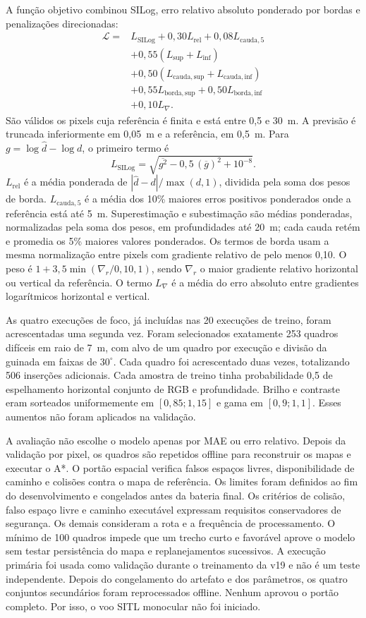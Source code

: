 A função objetivo combinou SILog, erro relativo absoluto ponderado por bordas e penalizações direcionadas:
\[
\begin{aligned}
\mathcal{L}={}&L_{\mathrm{SILog}}+0{,}30L_{\mathrm{rel}}
+0{,}08L_{\mathrm{cauda},5}\\
&+0{,}55(L_{\mathrm{sup}}+L_{\mathrm{inf}})\\
&+0{,}50(L_{\mathrm{cauda,sup}}+L_{\mathrm{cauda,inf}})\\
&+0{,}55L_{\mathrm{borda,sup}}+0{,}50L_{\mathrm{borda,inf}}\\
&+0{,}10L_{\nabla}.
\end{aligned}
\]
São válidos os pixels cuja referência é finita e está entre 0,5 e 30~m. A previsão é truncada inferiormente em 0,05~m e a referência, em 0,5~m. Para $g=\log \hat d-\log d$, o primeiro termo é
\[
L_{\mathrm{SILog}}=\sqrt{\overline{g^2}-0{,}5\,(\overline{g})^2+10^{-8}}.
\]
$L_{\mathrm{rel}}$ é a média ponderada de $|\hat d-d|/\max(d,1)$, dividida pela soma dos pesos de borda. $L_{\mathrm{cauda},5}$ é a média dos 10\% maiores erros positivos ponderados onde a referência está até 5~m. Superestimação e subestimação são médias ponderadas, normalizadas pela soma dos pesos, em profundidades até 20~m; cada cauda retém e promedia os 5\% maiores valores ponderados. Os termos de borda usam a mesma normalização entre pixels com gradiente relativo de pelo menos 0,10. O peso é $1+3{,}5\min(\nabla_r/0{,}10,1)$, sendo $\nabla_r$ o maior gradiente relativo horizontal ou vertical da referência. O termo $L_{\nabla}$ é a média do erro absoluto entre gradientes logarítmicos horizontal e vertical.

As quatro execuções de foco, já incluídas nas 20 execuções de treino, foram acrescentadas uma segunda vez. Foram selecionados exatamente 253 quadros difíceis em raio de 7~m, com alvo de um quadro por execução e divisão da guinada em faixas de $30^\circ$. Cada quadro foi acrescentado duas vezes, totalizando 506 inserções adicionais. Cada amostra de treino tinha probabilidade 0,5 de espelhamento horizontal conjunto de RGB e profundidade. Brilho e contraste eram sorteados uniformemente em $[0{,}85;1{,}15]$ e gama em $[0{,}9;1{,}1]$. Esses aumentos não foram aplicados na validação.

A avaliação não escolhe o modelo apenas por MAE ou erro relativo. Depois da validação por pixel, os quadros são repetidos offline para reconstruir os mapas e executar o A*. O portão espacial verifica falsos espaços livres, disponibilidade de caminho e colisões contra o mapa de referência. Os limites foram definidos ao fim do desenvolvimento e congelados antes da bateria final. Os critérios de colisão, falso espaço livre e caminho executável expressam requisitos conservadores de segurança. Os demais consideram a rota e a frequência de processamento. O mínimo de 100 quadros impede que um trecho curto e favorável aprove o modelo sem testar persistência do mapa e replanejamentos sucessivos. A execução primária foi usada como validação durante o treinamento da v19 e não é um teste independente. Depois do congelamento do artefato e dos parâmetros, os quatro conjuntos secundários foram reprocessados offline. Nenhum aprovou o portão completo. Por isso, o voo SITL monocular não foi iniciado.

